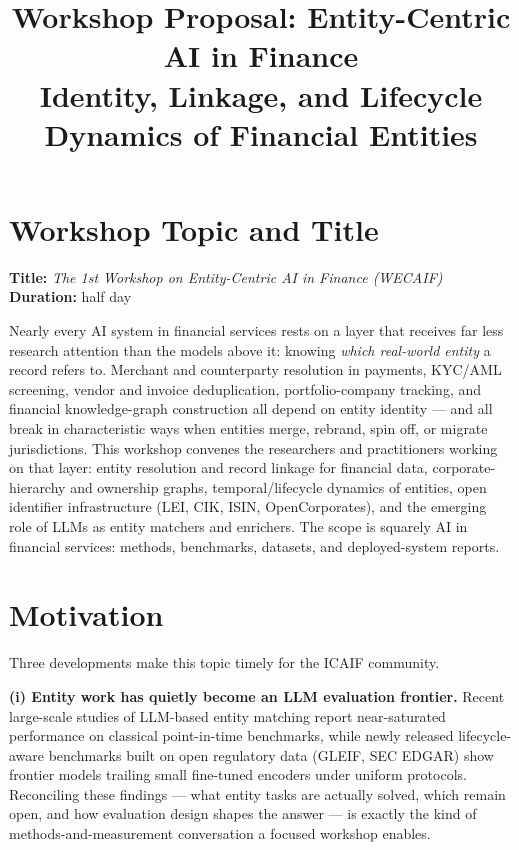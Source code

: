 \documentclass[12pt]{article}
\title{\textbf{Workshop Proposal: Entity-Centric AI in Finance\\
\large Identity, Linkage, and Lifecycle Dynamics of Financial Entities}}
\author{}
\date{}
\begin{document}
\maketitle
\vspace{-3em}

\section{Workshop Topic and Title}

\textbf{Title:} \emph{The 1st Workshop on Entity-Centric AI in Finance
(WECAIF)} \hfill \textbf{Duration:} half day

Nearly every AI system in financial services rests on a layer that
receives far less research attention than the models above it: knowing
\emph{which real-world entity} a record refers to. Merchant and
counterparty resolution in payments, KYC/AML screening, vendor and
invoice deduplication, portfolio-company tracking, and financial
knowledge-graph construction all depend on entity identity --- and all
break in characteristic ways when entities merge, rebrand, spin off,
or migrate jurisdictions. This workshop convenes the researchers and
practitioners working on that layer: entity resolution and record
linkage for financial data, corporate-hierarchy and ownership graphs,
temporal/lifecycle dynamics of entities, open identifier
infrastructure (LEI, CIK, ISIN, OpenCorporates), and the emerging role
of LLMs as entity matchers and enrichers. The scope is squarely AI in
financial services: methods, benchmarks, datasets, and deployed-system
reports.

\section{Motivation}

Three developments make this topic timely for the ICAIF community.

\textbf{(i) Entity work has quietly become an LLM evaluation
frontier.} Recent large-scale studies of LLM-based entity matching
report near-saturated performance on classical point-in-time
benchmarks, while newly released lifecycle-aware benchmarks built on
open regulatory data (GLEIF, SEC EDGAR) show frontier models trailing
small fine-tuned encoders under uniform protocols. Reconciling these
findings --- what entity tasks are actually solved, which remain open,
and how evaluation design shapes the answer --- is exactly the kind of
methods-and-measurement conversation a focused workshop enables.
\end{document}

